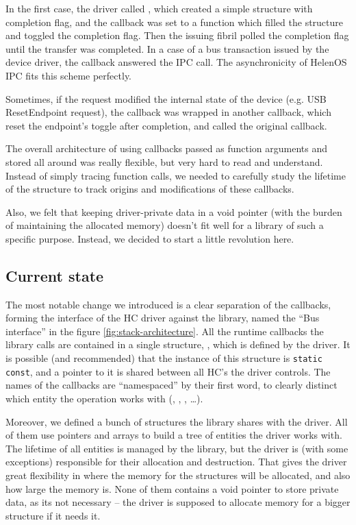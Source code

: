 In the first case, the driver called , which created
a simple structure with completion flag, and the callback was set to a function
which filled the structure and toggled the completion flag. Then the issuing
fibril polled the completion flag until the transfer was completed. In a case
of a bus transaction issued by the device driver, the callback answered the IPC
call. The asynchronicity of HelenOS IPC fits this scheme perfectly.

Sometimes, if the request modified the internal state of the device (e.g. USB
ResetEndpoint request), the callback was wrapped in another callback, which
reset the endpoint's toggle after completion, and called the original callback.

The overall architecture of using callbacks passed as function arguments and
stored all around was really flexible, but very hard to read and understand.
Instead of simply tracing function calls, we needed to carefully study the
lifetime of the structure to track origins and modifications of these
callbacks.

Also, we felt that keeping driver-private data in a void pointer (with the
burden of maintaining the allocated memory) doesn't fit well for a library of
such a specific purpose. Instead, we decided to start a little revolution here.

\subsection{Current state}

The most notable change we introduced is a clear separation of the callbacks,
forming the interface of the HC driver against the  library,
named the ``Bus interface'' in the figure \ref{fig:stack-architecture}. All the
runtime callbacks the library calls are contained in a single structure,
, which is defined by the driver. It is possible (and
recommended) that the instance of this structure is \texttt{static
const}, and a pointer to it is shared between all HC's the driver controls. The
names of the callbacks are ``namespaced'' by their first word, to clearly
distinct which entity the operation works with (,
, , \dots).

Moreover, we defined a bunch of structures the library shares with the driver.
All of them use pointers and arrays to build a tree of entities the driver
works with. The lifetime of all entities is managed by the library, but the
driver is (with some exceptions) responsible for their allocation and
destruction. That gives the driver great flexibility in where the memory for
the structures will be allocated, and also how large the memory is. None of
them contains a void pointer to store private data, as its not necessary -- the
driver is supposed to allocate memory for a bigger structure if it needs it.

